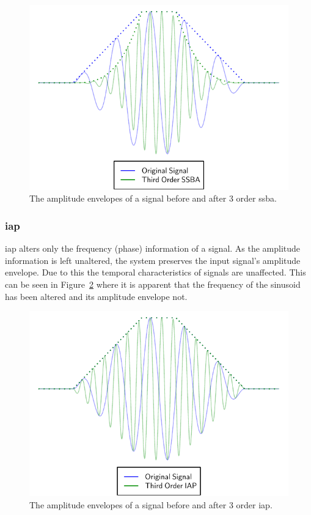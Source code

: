 			\begin{figure}[h!]
				\centering
				\includegraphics{chapter5/Images/SSBATemporalEffects.pdf}
				\caption{The amplitude envelopes of a signal before and after 3 order
					 \acrshort{ssba}.}
				\label{fig:SSBATemporalEffects}
			\end{figure}

		\subsubsection*{\acrshort{iap}}
			\acrshort{iap} alters only the frequency (phase) information of a signal. As the amplitude
			information is left unaltered, the system preserves the input signal's amplitude envelope. Due to
			this the temporal characteristics of signals are unaffected. This can be seen in
			Figure~\ref{fig:IAPTemporalEffects} where it is apparent that the frequency of the sinusoid has
			been altered and its amplitude envelope not.

			\begin{figure}[h!]
				\centering
				\includegraphics{chapter5/Images/IAPTemporalEffects.pdf}
				\caption{The amplitude envelopes of a signal before and after 3 order
					 \acrshort{iap}.}
				\label{fig:IAPTemporalEffects}
			\end{figure}
			
